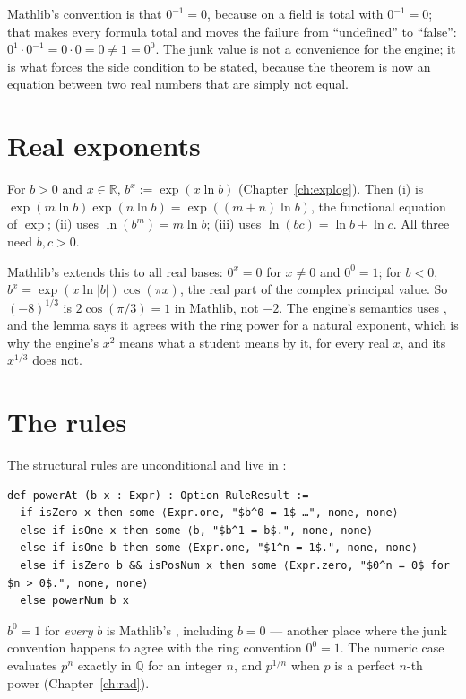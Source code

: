 Mathlib's convention is that $0^{-1} = 0$, because  on a field is total with
$0^{-1} = 0$; that makes every formula total and moves the failure from ``undefined'' to
``false'': $0^1 \cdot 0^{-1} = 0 \cdot 0 = 0 \neq 1 = 0^0$. The junk value is not a convenience
for the engine; it is what forces the side condition to be stated, because the theorem is now an
equation between two real numbers that are simply not equal.

\section{Real exponents}

For $b > 0$ and $x \in \mathbb{R}$, $b^x := \exp(x \ln b)$ (Chapter~\ref{ch:explog}). Then (i) is
$\exp(m \ln b)\exp(n \ln b) = \exp((m+n)\ln b)$, the functional equation of $\exp$; (ii) uses
$\ln(b^m) = m \ln b$; (iii) uses $\ln(bc) = \ln b + \ln c$. All three need $b, c > 0$.

Mathlib's  extends this to all real bases: $0^x = 0$ for $x \neq 0$ and $0^0 = 1$;
for $b < 0$, $b^x = \exp(x \ln|b|) \cos(\pi x)$, the real part of the complex principal value. So
$(-8)^{1/3}$ is $2 \cos(\pi/3) = 1$ in Mathlib, not $-2$. The engine's semantics uses
, and the lemma  says it agrees with the ring power for a
natural exponent, which is why the engine's $x^2$ means what a student means by it, for every
real $x$, and its $x^{1/3}$ does not.

\section{The rules}

The structural rules are unconditional and live in :

\begin{verbatim}
def powerAt (b x : Expr) : Option RuleResult :=
  if isZero x then some ⟨Expr.one, "$b^0 = 1$ …", none, none⟩
  else if isOne x then some ⟨b, "$b^1 = b$.", none, none⟩
  else if isOne b then some ⟨Expr.one, "$1^n = 1$.", none, none⟩
  else if isZero b && isPosNum x then some ⟨Expr.zero, "$0^n = 0$ for $n > 0$.", none, none⟩
  else powerNum b x
\end{verbatim}

$b^0 = 1$ for \emph{every} $b$ is Mathlib's , including $b = 0$ --- another
place where the junk convention happens to agree with the ring convention $0^0 = 1$. The
numeric case  evaluates $p^n$ exactly in $\mathbb{Q}$ for an integer $n$, and
$p^{1/n}$ when $p$ is a perfect $n$-th power (Chapter~\ref{ch:rad}).

